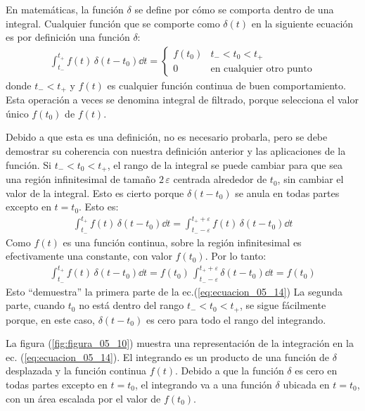 En matemáticas, la función $\delta$ se define por cómo se comporta dentro de una integral. Cualquier función que se comporte como $\delta (t)$ en la siguiente ecuación es por definición una función $\delta$:
\begin{align}
\int_{t_{-}}^{t_{+}} f(t) \, \delta(t - t_{0}) \dd{t} = \begin{cases}
f(t_{0}) & t_{-} < t_{0}  < t_{+} \\
0 & \mbox{en cualquier otro punto}
\end{cases}
\label{eq:ecuacion_05_14}
\end{align}
donde $t_{-} < t_{+}$ y $f (t)$ es cualquier función continua de buen comportamiento. Esta operación a veces se denomina integral de filtrado, porque selecciona el valor único $f(t_{0})$ de $f(t)$.
\par
Debido a que esta es una definición, no es necesario probarla, pero se debe demostrar su coherencia con nuestra definición anterior y las aplicaciones de la función. Si $t_{-} < t_{0}  < t_{+}$, el rango de la integral se puede cambiar para que sea una región infinitesimal de tamaño $2 \, \varepsilon$ centrada alrededor de $t_{0}$, sin cambiar el valor de la integral. Esto es cierto porque $\delta (t - t_{0})$ se anula en todas partes excepto en $t = t_{0}$. Esto es:
\begin{align}
\int_{t_{-}}^{t_{+}} f(t) \, \delta (t - t_{0}) \dd{t} = \int_{t_{-} - \varepsilon}^{t_{+} + \varepsilon} f(t) \, \delta (t - t_{0}) \dd{t} 
\label{eq:ecuacion_05_15}
\end{align}
Como $f (t)$ es una función continua, sobre la región infinitesimal es efectivamente una constante, con valor $f(t_{0})$. Por lo tanto:
\begin{align}
\int_{t_{-}}^{t_{+}} f(t) \, \delta (t - t_{0}) \dd{t} = f(t_{0}) \, \int_{t_{-} - \varepsilon}^{t_{+} + \varepsilon} \delta (t - t_{0}) \dd{t} = f(t_{0})
\label{eq:ecuacion_05_16}
\end{align}
Esto \enquote{demuestra} la primera parte de la ec.(\ref{eq:ecuacion_05_14}) La segunda parte, cuando $t_{0}$  no está dentro del rango $t_{-} < t_{0}  < t_{+}$, se sigue fácilmente porque, en este caso, $\delta (t - t_{0})$ es cero para todo el rango del integrando.
\par
La figura (\ref{fig:figura_05_10}) muestra una representación de la integración en la ec. (\ref{eq:ecuacion_05_14}). El integrando es un producto de una función de $\delta$ desplazada y la función continua $f (t)$. Debido a que la función $\delta$ es cero en todas partes excepto en $t = t_{0}$, el integrando va a una función $\delta$ ubicada en $t = t_{0}$, con un área escalada por el valor de $f (t_{0})$.
